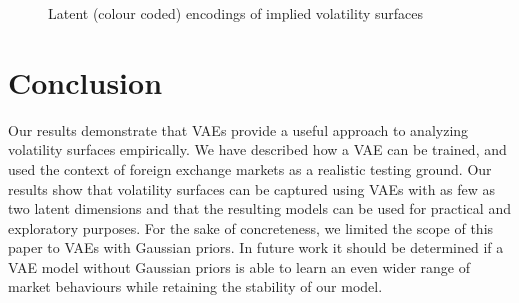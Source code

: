 \documentclass[12pt]{article}
\begin{document}
    
\begin{figure}[h]
  \centering
  \caption{Latent (colour coded) encodings of implied volatility surfaces}
  \label{fig:encodings}
\end{figure}


\section{Conclusion}
Our results demonstrate that VAEs provide a useful approach to analyzing volatility surfaces empirically. We have described how a VAE can be trained, and used the context of foreign exchange markets as a realistic testing ground. Our results show that volatility surfaces can be captured using VAEs with as few as two latent dimensions and that the resulting models can be used for practical and exploratory purposes. For the sake of concreteness, we limited the scope of this paper to VAEs with Gaussian priors. In future work it should be determined if a VAE model without Gaussian priors is able to learn an even wider range of market behaviours while retaining the stability of our model.


\newpage
\end{document}
